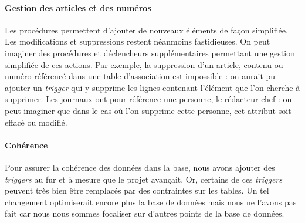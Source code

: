 \paragraph{Gestion des articles et des num\'{e}ros}{
    Les proc\'{e}dures permettent d'ajouter de nouveaux \'{e}l\'{e}ments de façon simplifi\'{e}e. Les modifications et suppressions restent n\'{e}anmoins fastidieuses. On peut imaginer des proc\'{e}dures et d\'{e}clencheurs suppl\'{e}mentaires permettant une gestion simplifi\'{e}e de ces actions. \newline
    Par exemple, la suppression d'un article, contenu ou num\'{e}ro r\'{e}f\'{e}renc\'{e} dans une table d'association est impossible : on aurait pu ajouter un \textit{trigger} qui y supprime les lignes contenant l'\'{e}l\'{e}ment que l'on cherche \`{a} supprimer. Les journaux ont pour r\'{e}f\'{e}rence une personne, le r\'{e}dacteur chef : on peut imaginer que dans le cas où l'on supprime cette personne, cet attribut soit effacé ou modifié.
}

\paragraph{Cohérence}{
    Pour assurer la cohérence des données dans la base, nous avons ajouter des \textit{triggers} au fur et à mesure que le projet avançait. Or, certains de ces \textit{triggers} peuvent très bien être remplacés par des contraintes sur les tables. Un tel changement optimiserait encore plus la base de données mais nous ne l'avons pas fait car nous nous sommes focaliser sur d'autres points de la base de données.
}